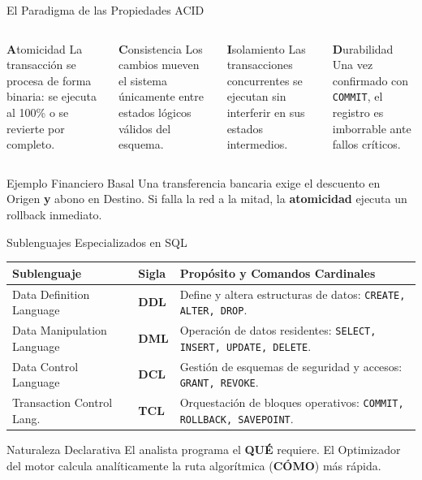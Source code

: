 \documentclass[12pt, aspectratio=169, UTF8]{beamer}
\begin{document}
\begin{frame}{El Paradigma de las Propiedades ACID}
  \begin{columns}[T]
      \begin{block}{\textbf{A}tomicidad}
        La transacción se procesa de forma binaria: se ejecuta al 100\% o se revierte por completo.
      \end{block}
      \begin{block}{\textbf{C}onsistencia}
        Los cambios mueven el sistema únicamente entre estados lógicos válidos del esquema.
      \end{block}
      \begin{block}{\textbf{I}solamiento}
        Las transacciones concurrentes se ejecutan sin interferir en sus estados intermedios.
      \end{block}
      \begin{block}{\textbf{D}urabilidad}
        Una vez confirmado con \texttt{COMMIT}, el registro es imborrable ante fallos críticos.
      \end{block}
  \end{columns}
  \begin{exampleblock}{Ejemplo Financiero Basal}
    Una transferencia bancaria exige el descuento en Origen \textbf{y} abono en Destino. Si falla la red a la mitad, la \textbf{atomicidad} ejecuta un rollback inmediato.
  \end{exampleblock}
\end{frame}

\begin{frame}{Sublenguajes Especializados en SQL}
  \begin{center}
  \small
  \renewcommand{\arraystretch}{1.25}
  \begin{tabularx}{0.92\textwidth}{@{} l l X @{}}
    \toprule
    \textbf{Sublenguaje} & \textbf{Sigla} & \textbf{Propósito y Comandos Cardinales} \\
    \midrule
    Data Definition Language   & \textbf{DDL} & Define y altera estructuras de datos: \texttt{CREATE, ALTER, DROP}. \\
    Data Manipulation Language & \textbf{DML} & Operación de datos residentes: \texttt{SELECT, INSERT, UPDATE, DELETE}. \\
    Data Control Language      & \textbf{DCL} & Gestión de esquemas de seguridad y accesos: \texttt{GRANT, REVOKE}. \\
    Transaction Control Lang.  & \textbf{TCL} & Orquestación de bloques operativos: \texttt{COMMIT, ROLLBACK, SAVEPOINT}. \\
    \bottomrule
  \end{tabularx}
  \end{center}
  \begin{alertblock}{Naturaleza Declarativa}
    El analista programa el \textbf{QUÉ} requiere. El Optimizador del motor calcula analíticamente la ruta algorítmica (\textbf{CÓMO}) más rápida.
  \end{alertblock}
\end{frame}
\end{document}
